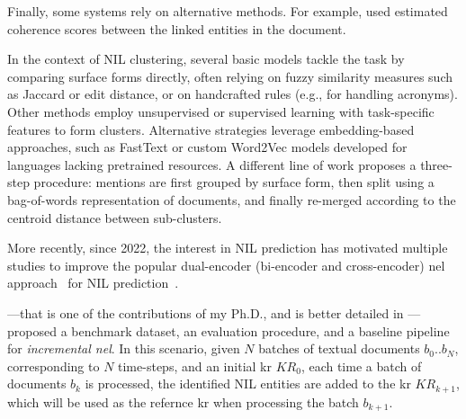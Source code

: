 Finally, some systems rely on alternative methods. For example, \textcite{Paikens-EtAl:2017:TAC-KBP} used estimated coherence scores between the linked entities in the document.

In the context of NIL clustering, several basic models \cite{simone_15,simone_33,simone_73,simone_68,simone_27,simone_67,simone_38,simone_65,simone_63,simone_31} tackle the task by comparing surface forms directly, often relying on fuzzy similarity measures such as Jaccard or edit distance, or on handcrafted rules (e.g., for handling acronyms). Other methods \cite{simone_77,simone_65,simone_33} employ unsupervised or supervised learning with task-specific features to form clusters. Alternative strategies \cite{simone_2} leverage embedding-based approaches, such as FastText \cite{fasttext} or custom Word2Vec models \cite{simone_6} developed for languages lacking pretrained resources. A different line of work \cite{simone_24} proposes a three-step procedure: mentions are first grouped by surface form, then split using a bag-of-words representation of documents, and finally re-merged according to the centroid distance between sub-clusters.




More recently, since 2022, the interest in NIL prediction has motivated multiple studies to improve the popular dual-encoder (bi-encoder and cross-encoder) \ac{nel} approach~\cite{blink} for NIL prediction~\cite{ijckg2022,kassner-etal-2022-edin,aydin-etal-2022-find,Heist2023nastylinker,zhu-etal-2023-learn}.

\textcite{ijckg2022}---that is one of the contributions of my Ph.D., and is better detailed in ---proposed a benchmark dataset, an evaluation procedure, and a baseline pipeline for \emph{incremental \acl{nel}}. In this scenario, given $N$ batches of textual documents $b_0..b_N$, corresponding to $N$ time-steps, and an initial \ac{kr} $KR_0$, each time a batch of documents $b_k$ is processed, the identified NIL entities are added to the \ac{kr} $KR_{k+1}$, which will be used as the refernce \ac{kr} when processing the batch $b_{k+1}$.

